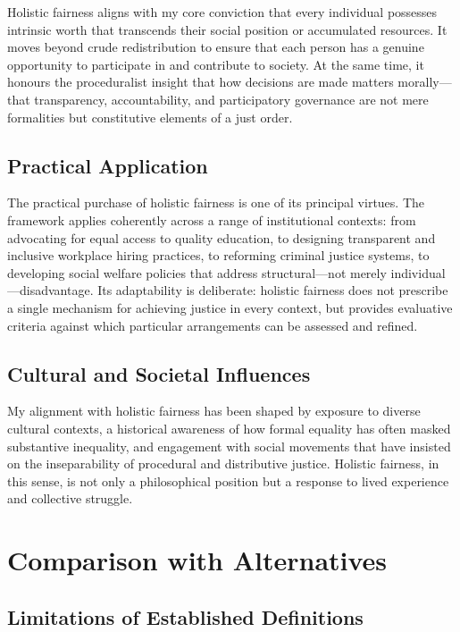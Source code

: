 \documentclass[11pt]{../shared/essay/essay}
\begin{document}
Holistic fairness aligns with my core conviction that every individual possesses intrinsic worth
that transcends their social position or accumulated resources. It moves beyond crude
redistribution to ensure that each person has a genuine opportunity to participate in and
contribute to society. At the same time, it honours the proceduralist insight that how decisions
are made matters morally---that transparency, accountability, and participatory governance are
not mere formalities but constitutive elements of a just order.

\subsection{Practical Application}

The practical purchase of holistic fairness is one of its principal virtues. The framework
applies coherently across a range of institutional contexts: from advocating for equal access to
quality education, to designing transparent and inclusive workplace hiring practices, to
reforming criminal justice systems, to developing social welfare policies that address
structural---not merely individual---disadvantage. Its adaptability is deliberate: holistic
fairness does not prescribe a single mechanism for achieving justice in every context, but
provides evaluative criteria against which particular arrangements can be assessed and refined.

\subsection{Cultural and Societal Influences}

My alignment with holistic fairness has been shaped by exposure to diverse cultural contexts,
a historical awareness of how formal equality has often masked substantive inequality, and
engagement with social movements that have insisted on the inseparability of procedural and
distributive justice. Holistic fairness, in this sense, is not only a philosophical position but a
response to lived experience and collective struggle.

\section{Comparison with Alternatives}

\subsection{Limitations of Established Definitions}
\end{document}
